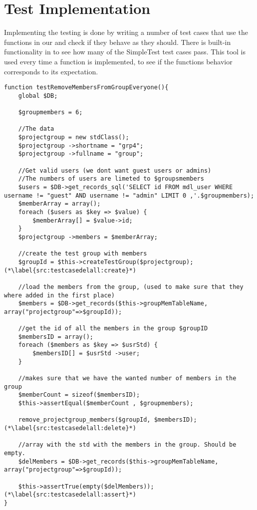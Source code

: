 \section{Test Implementation}
\label{sec:testimplementation}
Implementing the testing is done by writing a number of test cases that use the functions in our \subsystem{} and check if they behave as they should.
There is built-in functionality in \moodle{} to see how many of the SimpleTest test cases pass.
This tool is used every time a function is implemented, to see if the functions behavior corresponds to its expectation.

\begin{lstlisting}[style=phpCode, caption=\myCaption{A test case for the function remove\_projectgroup\_members. The test case tests if the function correctly removes all the members of the project group when instructed to.}, label=src:testcasedelall]
function testRemoveMembersFromGroupEveryone(){
    global $DB;
    
    $groupmembers = 6;
    
    //The data
    $projectgroup = new stdClass(); 
    $projectgroup ->shortname = "grp4";
    $projectgroup ->fullname = "group";
    
    //Get valid users (we dont want guest users or admins)
    //The numbers of users are limeted to $groupsmembers
    $users = $DB->get_records_sql('SELECT id FROM mdl_user WHERE username != "guest" AND username != "admin" LIMIT 0 ,'.$groupmembers);
    $memberArray = array();
    foreach ($users as $key => $value) {
        $memberArray[] = $value->id;
    }
    $projectgroup ->members = $memberArray;
    
    //create the test group with members
    $groupId = $this->createTestGroup($projectgroup); (*\label{src:testcasedelall:create}*)
    
    //load the members from the group, (used to make sure that they where added in the first place)
    $members = $DB->get_records($this->groupMemTableName, array("projectgroup"=>$groupId));
    
    //get the id of all the members in the group $groupID
    $membersID = array();
    foreach ($members as $key => $usrStd) {
        $membersID[] = $usrStd ->user;
    } 
    
    //makes sure that we have the wanted number of members in the group
    $memberCount = sizeof($membersID);
    $this->assertEqual($memberCount , $groupmembers);
    
    remove_projectgroup_members($groupId, $membersID); (*\label{src:testcasedelall:delete}*)
    
    //array with the std with the members in the group. Should be empty.
    $delMembers = $DB->get_records($this->groupMemTableName, array("projectgroup"=>$groupId));
    
    $this->assertTrue(empty($delMembers)); (*\label{src:testcasedelall:assert}*)
}
\end{lstlisting}

